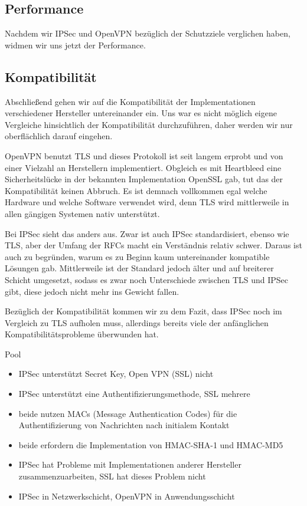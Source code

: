 \documentclass[12pt]{scrartcl}
\begin{document}
\subsection{Performance}
Nachdem wir IPSec und OpenVPN bezüglich der Schutzziele verglichen haben, widmen wir uns jetzt der Performance.


\subsection{Kompatibilität}
Abschließend gehen wir auf die Kompatibilität der Implementationen verschiedener Hersteller untereinander ein. Uns war es nicht möglich eigene Vergleiche hinsichtlich der Kompatibilität durchzuführen, daher werden wir nur oberflächlich darauf eingehen.

OpenVPN benutzt TLS und dieses Protokoll ist seit langem erprobt und von einer Vielzahl an Herstellern implementiert. Obgleich es mit Heartbleed eine Sicherheitslücke in der bekannten Implementation OpenSSL gab, tut das der Kompatibilität keinen Abbruch. Es ist demnach vollkommen egal welche Hardware und welche Software verwendet wird, denn TLS wird mittlerweile in allen gängigen Systemen nativ unterstützt.

Bei IPSec sieht das anders aus. Zwar ist auch IPSec standardisiert, ebenso wie TLS, aber der Umfang der RFCs macht ein Verständnis relativ schwer. Daraus ist auch zu begründen, warum es zu Beginn kaum untereinander kompatible Lösungen gab\cite{Alshamsi2005}. Mittlerweile ist der Standard jedoch älter und auf breiterer Schicht umgesetzt, sodass es zwar noch Unterschiede zwischen TLS und IPSec gibt, diese jedoch nicht mehr ins Gewicht fallen.

Bezüglich der Kompatibilität kommen wir zu dem Fazit, dass IPSec noch im Vergleich zu TLS aufholen muss, allerdings bereits viele der anfänglichen Kompatibilitätsprobleme überwunden hat.

\clearpage

Pool
\begin{itemize}
	\item IPSec unterstützt Secret Key\cite{Alshamsi2005}, Open VPN (SSL) nicht
	\item IPSec unterstützt eine Authentifizierungsmethode, SSL mehrere\cite{Alshamsi2005}
	\item beide nutzen MACs (Message Authentication Codes) für die Authentifizierung von Nachrichten nach initialem Kontakt\cite{Alshamsi2005}
	\item beide erfordern die Implementation von HMAC-SHA-1 und HMAC-MD5\cite{Alshamsi2005}
	\item IPSec hat Probleme mit Implementationen anderer Hersteller zusammenzuarbeiten, SSL hat dieses Problem nicht\cite{Alshamsi2005}
	\item IPSec in Netzwerkschicht, OpenVPN in Anwendungsschicht
\end{itemize}
\end{document}
